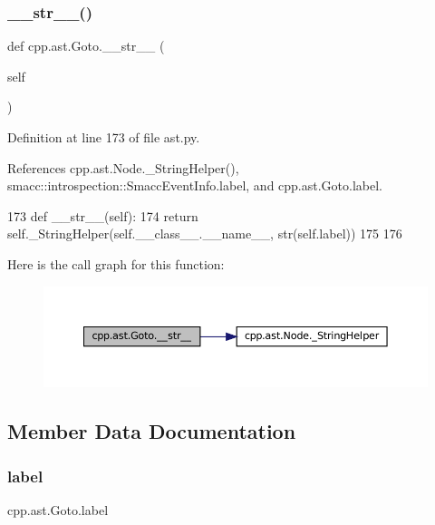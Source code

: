 \subsubsection{\texorpdfstring{\+\_\+\+\_\+str\+\_\+\+\_\+()}{\_\_str\_\_()}}
{\footnotesize\ttfamily def cpp.\+ast.\+Goto.\+\_\+\+\_\+str\+\_\+\+\_\+ (\begin{DoxyParamCaption}\item[{}]{self }\end{DoxyParamCaption})}



Definition at line 173 of file ast.\+py.



References cpp.\+ast.\+Node.\+\_\+\+String\+Helper(), smacc\+::introspection\+::\+Smacc\+Event\+Info.\+label, and cpp.\+ast.\+Goto.\+label.


\begin{DoxyCode}
173     \textcolor{keyword}{def }\_\_str\_\_(self):
174         \textcolor{keywordflow}{return} self.\_StringHelper(self.\_\_class\_\_.\_\_name\_\_, str(self.label))
175 
176 
\end{DoxyCode}
Here is the call graph for this function\+:
\nopagebreak
\begin{figure}[H]
\begin{center}
\leavevmode
\includegraphics[width=350pt]{classcpp_1_1ast_1_1Goto_a508b6bc091cf06bfed73a33368c236c9_cgraph}
\end{center}
\end{figure}


\subsection{Member Data Documentation}
\mbox{\label{classcpp_1_1ast_1_1Goto_a685284ea5f3b21f39aff7f5db841c8f5}} 
\subsubsection{\texorpdfstring{label}{label}}
{\footnotesize\ttfamily cpp.\+ast.\+Goto.\+label}



